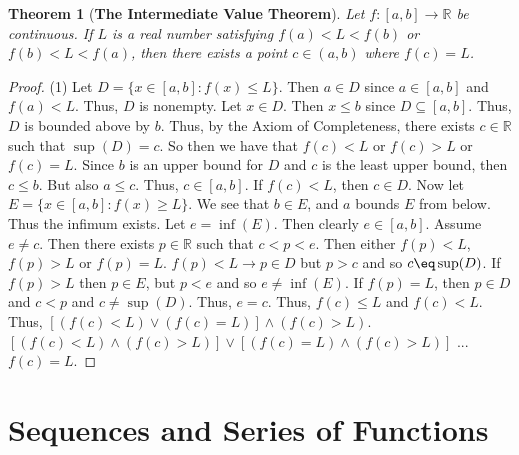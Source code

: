 \documentclass{article}
\newtheorem{theorem}{Theorem}[section]
\theoremstyle{definition}
\theoremstyle{remark}
\theoremstyle{definition}
\begin{document}
\begin{theorem}[\textbf{The Intermediate Value Theorem}]
    Let $f\colon[a,b]\rightarrow\mathbb{R}$ be continuous. If $L$ is a real number satisfying $f(a)<L<f(b)$ or $f(b)<L<f(a)$, then there exists a point $c\in(a,b)$ where $f(c)=L$. 
\end{theorem}

\begin{proof}
    (1) Let $D=\{x\in[a,b]\colon f(x)\leq L\}$. Then $a\in D$ since $a\in[a,b]$ and $f(a)<L$. Thus, $D$ is nonempty. Let $x\in D$. Then $x\leq b$ since $D\subseteq[a,b]$. Thus, $D$ is bounded above by $b$. Thus, by the Axiom of Completeness, there exists $c\in\mathbb{R}$ such that $\sup(D)=c$. So then we have that $f(c)<L$ or $f(c)>L$ or $f(c)=L$. Since $b$ is an upper bound for $D$ and $c$ is the least upper bound, then $c\leq b$. But also $a\leq c$. Thus, $c\in[a,b]$. If $f(c)< L$, then $c\in D$. Now let $E=\{x\in[a,b]\colon f(x)\geq L\}.$ We see that $b\in E$, and $a$ bounds $E$ from below. Thus the infimum exists. Let $e=\inf(E)$. Then clearly $e\in[a,b]$. Assume $e\neq c$. Then there exists $p\in\mathbb{R}$ such that $c<p<e$. Then either $f(p)<L$, $f(p)>L$ or $f(p)=L$. $f(p)<L\rightarrow p\in D$ but $p>c$ and so $c
    \eq\sup(D)$. If $f(p)>L$ then $p\in E$, but $p<e$ and so $e\neq\inf(E)$. If $f(p)=L$, then $p\in D$ and $c<p$ and $c\neq\sup(D)$. Thus, $e=c$. Thus, $f(c)\leq L$ and $f(c)<L$. Thus, $[(f(c)<L)\vee(f(c)=L)]\wedge(f(c)>L)$. $[(f(c)<L)\wedge(f(c)>L)]\vee[(f(c)=L)\wedge(f(c)>L)]$ ... $f(c)=L$.
    
\end{proof}

\section{Sequences and Series of Functions}

\n
\end{document}
